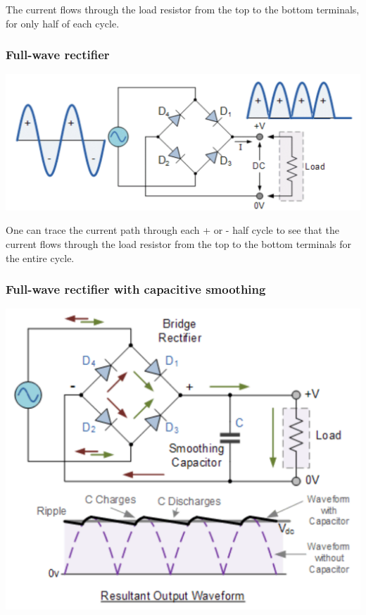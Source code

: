 \documentclass[11pt]{article}
\begin{document}
The current flows through the load resistor from the top to the bottom terminals, for only half of each cycle.
\subsubsection{Full-wave rectifier}
\label{sec:org8c06cdb}
\begin{center}
\includegraphics[width=.9\linewidth]{./images/full-wave-rectifier.png}
\end{center}

One can trace the current path through each + or - half cycle to see that the current flows through the load resistor from the top to the bottom terminals for the entire cycle.
\subsubsection{Full-wave rectifier with capacitive smoothing}
\label{sec:org7a3353e}
\begin{center}
\includegraphics[width=.9\linewidth]{./images/full-wave-rectifier-with-capacitor.png}
\end{center}
\end{document}
